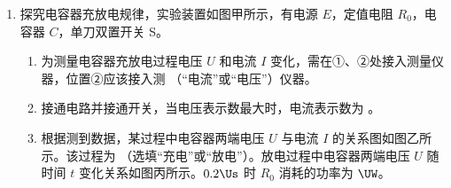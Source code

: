\documentclass[\gkver]{gaokaozhenti}
\begin{document}
\begin{enumerate}
{（2）沙桶从开始运动到静止上升高度为 $8.4 \Ucm$，机械能增加量为 $Mgh = 0.136 \times 9.8 \times 0.084 \UJ = 0.11 \UJ$。
}

\item
探究电容器充放电规律，实验装置如图甲所示，有电源 $E$，定值电阻 $R_{0}$，电容器 $C$，单刀双置开关 S。
\begin{enumerate}
	\item
	为测量电容器充放电过程电压 $U$ 和电流 $I$ 变化，需在①、②处接入测量仪器，位置②应该接入测 （“电流”或“电压”）仪器。
	\item
	接通电路并接通开关，当电压表示数最大时，电流表示数为 。
	\item
	根据测到数据，某过程中电容器两端电压 $U$ 与电流 $I$ 的关系图如图乙所示。该过程为 （选填“充电”或“放电”）。放电过程中电容器两端电压 $U$ 随时间 $t$ 变化关系如图丙所示。$0.2 \Us$ 时 $R_{0}$ 消耗的功率为  $\UW$。
\end{enumerate}


\end{enumerate}
\end{document}
